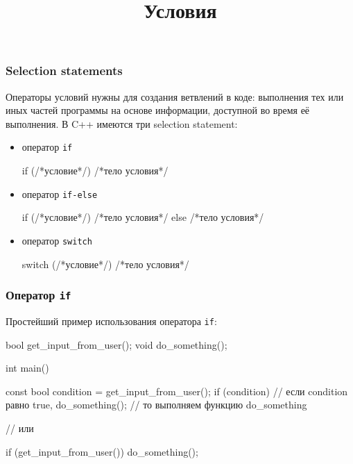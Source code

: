\documentclass[compress, 8pt, aspectratio=169]{beamer}
\title{Условия}
\begin{document}
\frame[plain]{\titlepage}

\begin{frame}[fragile]

    \frametitle{Selection statements}

    Операторы условий нужны для создания ветвлений в коде: выполнения тех или
    иных частей программы на основе информации, доступной во время её выполнения.
    В C++ имеются три selection statement:

    \hfill \break

    \begin{itemize}
        \item оператор \verb|if|\footnotemark{}
        \begin{myinplacelisting}[minted language=cpp]
if (/*условие*/) {/*тело условия*/}
        \end{myinplacelisting}

        \item оператор \verb|if-else|
        \begin{myinplacelisting}[minted language=cpp]
if (/*условие*/) {/*тело условия*/} else {/*тело условия*/}
        \end{myinplacelisting}

        \item оператор \verb|switch|
        \begin{myinplacelisting}[minted language=cpp]
switch (/*условие*/) {/*тело условия*/}
        \end{myinplacelisting}
    \end{itemize}


\end{frame}

\begin{frame}[fragile]

    \frametitle{Оператор \texttt{if}}

    Простейший пример использования оператора \verb|if|:

    \begin{myinplacelisting}[minted language=cpp]
bool get_input_from_user();
void do_something();

int main() {

    const bool condition = get_input_from_user();
    if (condition) {    // если condition равно true,
        do_something(); // то выполняем функцию do_something
    }

    // или

    if (get_input_from_user()) {
        do_something();
    }

}
    \end{myinplacelisting}

\end{frame}
\end{document}
